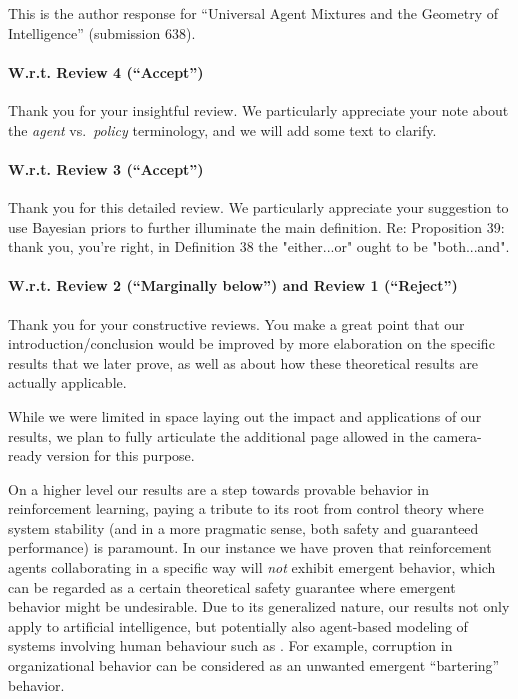 \documentclass{article}
\begin{document}
This is the author response for ``Universal Agent Mixtures and the Geometry of Intelligence''
(submission 638).

\paragraph{W.r.t. Review 4 (``Accept'')}

Thank you for your insightful review. We particularly appreciate your note about the \emph{agent} vs.\ \emph{policy} terminology, and we will add some text to clarify.

\paragraph{W.r.t. Review 3 (``Accept'')}

Thank you for this detailed review. We particularly appreciate your suggestion to use Bayesian priors to further illuminate the main definition. Re: Proposition 39: thank you, you're right, in Definition 38 the "either...or" ought to be "both...and".

\paragraph{W.r.t. Review 2 (``Marginally below'') and Review 1 (``Reject'')}

Thank you for your constructive reviews. You make a great point that our introduction/conclusion would
be improved by more elaboration on the specific results that we later prove, as well as
about how these theoretical results are actually applicable.

While we were limited in space laying out the impact and
applications
of our results, we plan to fully articulate the additional page
allowed in the camera-ready version for this purpose.

On a higher level our results are a step towards provable behavior in reinforcement learning,
paying a tribute to its root from control theory where system stability (and in a more pragmatic sense,
both safety and guaranteed performance)
is paramount.
In our instance we have proven that reinforcement agents collaborating
in a specific way will \emph{not} exhibit emergent behavior, which
can be regarded as a certain theoretical safety guarantee where emergent behavior might be undesirable.
Due to its generalized nature, our results not only apply to artificial intelligence,
but potentially also agent-based modeling of
systems involving human behaviour such as \cite{Bouarfa2013AgentbasedMA}.
For example, corruption in organizational behavior can be considered as an unwanted emergent ``bartering'' behavior. 
\end{document}
